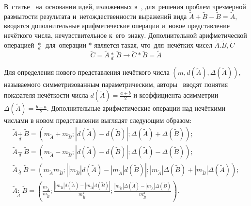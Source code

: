 В~статье~\cite{Piter_SCM} на~основании идей, изложенных в~\cite{Borisov_Krumberg_Riga, Alexeev_Riga}, для~решения проблем чрезмерной размытости результата и~нетождественности выражений вида $\tilde A+\tilde B-\tilde B=\tilde A$, вводятся дополнительные арифметические операции и~новое представление нечёткого числа, нечувствительное к~его~знаку. Дополнительной арифметической операцией $\underset{d}{\mathop{*}}\,$ для~операции $*$ является такая, что~для~нечётких чисел $\tilde A. \tilde B, \tilde C$
\begin{equation}
\label{eq:complementary-operations}
	\tilde{C}=\tilde{A}\underset{d}{\mathop{*}}\,\tilde{B}\to \tilde{C}*\tilde{B}=\tilde{A}
\end{equation}

Для определения нового представления нечёткого числа $\left( m,d\left( {\tilde{A}} \right),\Delta \left( {\tilde{A}} \right) \right)$, называемого симметризованным параметрическим, авторы~\cite{Piter_SCM} вводят понятия показателя нечёткости числа $\displaystyle d\left( {\tilde{A}} \right)=\frac{a+b}{2}$ и коэффициента асимметрии $\displaystyle \Delta \left( {\tilde{A}} \right)=\frac{b-a}{2}$. Дополнительные арифметические операции над нечёткими числами в новом представлении выглядят следующим образом:
\begin{gather*}
		\tilde{A}\underset{d}{\mathop{+}}\,\tilde{B}=\left( {{m}_{{\tilde{A}}}}+{{m}_{{\tilde{B}}}};\left| d\left( {\tilde{A}} \right)-d\left( {\tilde{B}} \right) \right|;\Delta \left( {\tilde{A}} \right)+\Delta \left( {\tilde{B}} \right) \right); \\ 
		\tilde{A}\underset{d}{\mathop{-}}\,\tilde{B}=\left( {{m}_{{\tilde{A}}}}-{{m}_{{\tilde{B}}}};\left| d\left( {\tilde{A}} \right)-d\left( {\tilde{B}} \right) \right|;\Delta \left( {\tilde{A}} \right)-\Delta \left( {\tilde{B}} \right) \right); \\ 
		\tilde{A}\underset{d}{\mathop{\cdot }}\,\tilde{B}=\left( {{m}_{{\tilde{A}}}}{{m}_{{\tilde{B}}}};\left| \left| {{m}_{{\tilde{B}}}} \right|d\left( {\tilde{A}} \right)-\left| {{m}_{{\tilde{A}}}} \right|d\left( {\tilde{B}} \right) \right|;\left| {{m}_{{\tilde{A}}}} \right|\Delta \left( {\tilde{B}} \right)+\left| {{m}_{{\tilde{B}}}} \right|\Delta \left( {\tilde{A}} \right) \right); \\ 
		\tilde{A}\underset{d}{\mathop{:}}\,\tilde{B}=\left( \frac{{{m}_{{\tilde{A}}}}}{{{m}_{{\tilde{B}}}}};\frac{\left| \left| {{m}_{{\tilde{B}}}} \right|d\left( {\tilde{A}} \right)-\left| {{m}_{{\tilde{A}}}} \right|d\left( {\tilde{B}} \right) \right|}{m_{{\tilde{B}}}^{2}};\frac{\left| {{m}_{{\tilde{B}}}} \right|\Delta \left( {\tilde{A}} \right)-\left| {{m}_{{\tilde{A}}}} \right|\Delta \left( {\tilde{B}} \right)}{m_{{\tilde{B}}}^{2}} \right).
\end{gather*}

